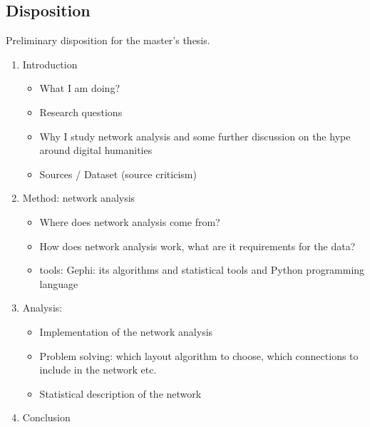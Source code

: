 \documentclass[a4paper,12pt]{article}
\begin{document}
\begin{onehalfspace}
\section{Disposition}

Preliminary disposition for the master's thesis.

\begin{enumerate}
	\item Introduction \begin{itemize}
		\item What I am doing?
		\item Research questions
		\item Why I study network analysis and some further discussion on the hype around digital humanities
		\item Sources / Dataset (source criticism) \end{itemize}
	\item Method: network analysis \begin{itemize}
		\item Where does network analysis come from?
		\item How does network analysis work, what are it requirements for the data?
		\item tools: Gephi: its algorithms and statistical tools and Python programming language \end{itemize}
	\item Analysis: \begin{itemize}
		\item Implementation of the network analysis
		\item Problem solving: which layout algorithm to choose, which connections to include in the network etc. 
		\item Statistical description of the network \end{itemize}
	\item Conclusion
\end{enumerate}
\end{onehalfspace}
\end{document}
